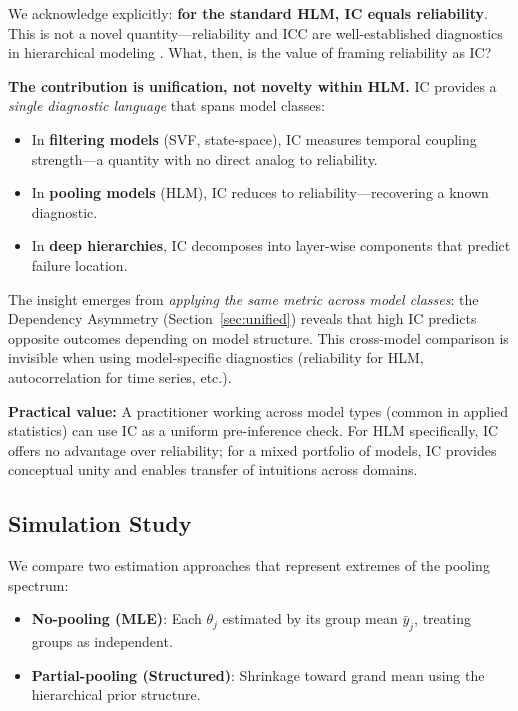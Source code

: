 \documentclass[10pt]{article} %
\theoremstyle{plain}
\theoremstyle{definition}
\begin{document}
\begin{tcolorbox}[breakable, colback=yellow!10, colframe=orange!50!black, title=\textbf{Clarification: IC Reduces to Reliability for HLM}, fonttitle=\bfseries]
\label{box:hlm-reliability}
We acknowledge explicitly: \textbf{for the standard HLM, IC equals reliability}. This is not a novel quantity---reliability and ICC are well-established diagnostics in hierarchical modeling \citep{raudenbush1986hierarchical}. What, then, is the value of framing reliability as IC?

\textbf{The contribution is unification, not novelty within HLM.} IC provides a \emph{single diagnostic language} that spans model classes:
\begin{itemize}
    \item In \textbf{filtering models} (SVF, state-space), IC measures temporal coupling strength---a quantity with no direct analog to reliability.
    \item In \textbf{pooling models} (HLM), IC reduces to reliability---recovering a known diagnostic.
    \item In \textbf{deep hierarchies}, IC decomposes into layer-wise components that predict failure location.
\end{itemize}

The insight emerges from \emph{applying the same metric across model classes}: the Dependency Asymmetry (Section~\ref{sec:unified}) reveals that high IC predicts opposite outcomes depending on model structure. This cross-model comparison is invisible when using model-specific diagnostics (reliability for HLM, autocorrelation for time series, etc.).

\textbf{Practical value:} A practitioner working across model types (common in applied statistics) can use IC as a uniform pre-inference check. For HLM specifically, IC offers no advantage over reliability; for a mixed portfolio of models, IC provides conceptual unity and enables transfer of intuitions across domains.
\end{tcolorbox}

\subsection{Simulation Study}

We compare two estimation approaches that represent extremes of the pooling spectrum:
\begin{itemize}
    \item \textbf{No-pooling (MLE)}: Each $\theta_j$ estimated by its group mean $\bar{y}_j$, treating groups as independent.
    \item \textbf{Partial-pooling (Structured)}: Shrinkage toward grand mean using the hierarchical prior structure.
\end{itemize}
\end{document}
